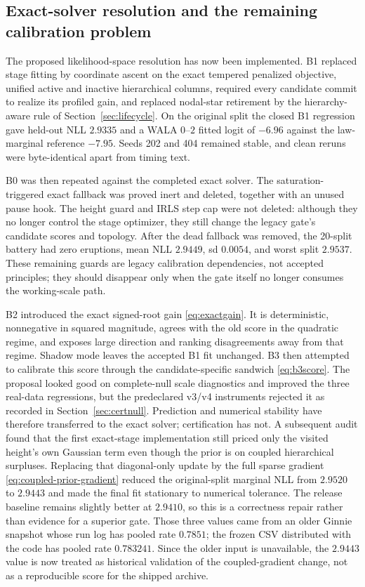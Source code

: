 \documentclass[11pt]{article}
\begin{document}
\subsection{Exact-solver resolution and the remaining calibration problem}

The proposed likelihood-space resolution has now been implemented. B1 replaced stage fitting by
coordinate ascent on the exact tempered penalized objective, unified active and inactive hierarchical
columns, required every candidate commit to realize its profiled gain, and replaced nodal-star
retirement by the hierarchy-aware rule of Section~\ref{sec:lifecycle}. On the original split the
closed B1 regression gave held-out NLL $2.9335$ and a WALA $0$--$2$ fitted logit of $-6.96$ against
the law-marginal reference $-7.95$. Seeds 202 and 404 remained stable, and clean reruns were
byte-identical apart from timing text.

B0 was then repeated against the completed exact solver. The saturation-triggered exact fallback was
proved inert and deleted, together with an unused pause hook. The height guard and IRLS step cap were
not deleted: although they no longer control the stage optimizer, they still change the legacy gate's
candidate scores and topology. After the dead fallback was removed, the 20-split battery had zero
eruptions, mean NLL $2.9449$, sd $0.0054$, and worst split $2.9537$. These remaining guards are
legacy calibration dependencies, not accepted principles; they should disappear only when the gate
itself no longer consumes the working-scale path.

B2 introduced the exact signed-root gain \eqref{eq:exactgain}. It is deterministic, nonnegative in
squared magnitude, agrees with the old score in the quadratic regime, and exposes large direction and
ranking disagreements away from that regime. Shadow mode leaves the accepted B1 fit unchanged. B3
then attempted to calibrate this score through the candidate-specific sandwich
\eqref{eq:b3score}. The proposal looked good on complete-null scale diagnostics and improved the
three real-data regressions, but the predeclared v3/v4 instruments rejected it as recorded in
Section~\ref{sec:certnull}. Prediction and numerical stability have therefore transferred to the
exact solver; certification has not. A subsequent audit found that the first exact-stage
implementation still priced only the visited height's own Gaussian term even though the prior is on
coupled hierarchical surpluses. Replacing that diagonal-only update by the full sparse gradient
\eqref{eq:coupled-prior-gradient} reduced the original-split marginal NLL from $2.9520$ to $2.9443$
and made the final fit stationary to numerical tolerance. The release baseline remains slightly
better at $2.9410$, so this is a correctness repair rather than evidence for a superior gate. Those
three values came from an older Ginnie snapshot whose run log has pooled rate $0.7851$; the frozen
CSV distributed with the code has pooled rate $0.783241$. Since the older input is unavailable, the
$2.9443$ value is now treated as historical validation of the coupled-gradient change, not as a
reproducible score for the shipped archive.
\end{document}

